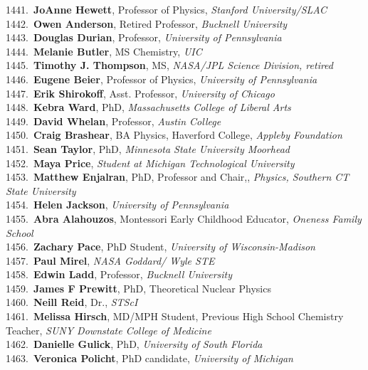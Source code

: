 1441.~{\bf JoAnne Hewett}, Professor of Physics, {\sl Stanford University/SLAC} \\
1442.~{\bf Owen Anderson}, Retired Professor, {\sl Bucknell University} \\
1443.~{\bf Douglas Durian}, Professor, {\sl University of Pennsylvania} \\
1444.~{\bf Melanie Butler}, MS Chemistry, {\sl UIC} \\
1445.~{\bf Timothy J. Thompson}, MS, {\sl NASA/JPL Science Division, retired} \\
1446.~{\bf Eugene Beier}, Professor of Physics, {\sl University of Pennsylvania} \\
1447.~{\bf Erik Shirokoff}, Asst. Professor, {\sl University of Chicago} \\
1448.~{\bf Kebra Ward}, PhD, {\sl Massachusetts College of Liberal Arts} \\
1449.~{\bf David Whelan}, Professor, {\sl Austin College} \\
1450.~{\bf Craig Brashear}, BA Physics, Haverford College, {\sl Appleby Foundation} \\
1451.~{\bf Sean Taylor}, PhD, {\sl Minnesota State University Moorhead} \\
1452.~{\bf Maya Price}, {\sl Student at Michigan Technological University } \\
1453.~{\bf Matthew Enjalran}, PhD, Professor and Chair,, {\sl Physics, Southern CT State University} \\
1454.~{\bf Helen Jackson}, {\sl University of Pennsylvania} \\
1455.~{\bf Abra Alahouzos}, Montessori Early Childhood Educator, {\sl Oneness Family School} \\
1456.~{\bf Zachary Pace}, PhD Student, {\sl University of Wisconsin-Madison} \\
1457.~{\bf Paul Mirel}, {\sl NASA Goddard/ Wyle STE} \\
1458.~{\bf Edwin Ladd}, Professor, {\sl Bucknell University} \\
1459.~{\bf James F Prewitt}, PhD, Theoretical Nuclear Physics \\
1460.~{\bf Neill Reid}, Dr., {\sl STScI} \\
1461.~{\bf Melissa Hirsch}, MD/MPH Student, Previous High School Chemistry Teacher, {\sl SUNY Downstate College of Medicine} \\
1462.~{\bf Danielle Gulick}, PhD, {\sl University of South Florida} \\
1463.~{\bf Veronica Policht}, PhD candidate, {\sl University of Michigan} \\
